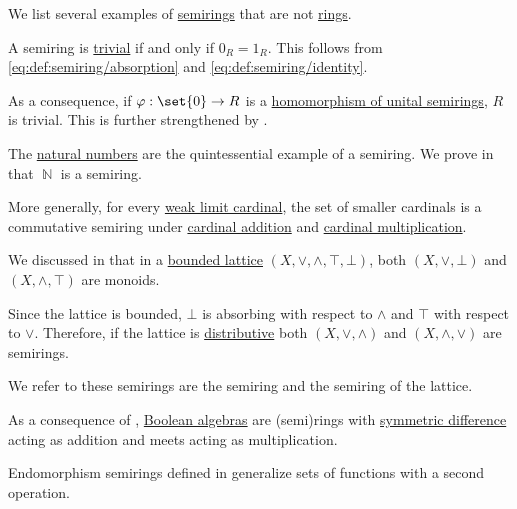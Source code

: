 \begin{example}\label{ex:def:semiring}
  We list several examples of \hyperref[def:semiring]{semirings} that are not \hyperref[def:ring]{rings}.

  \begin{thmenum}
     A semiring is \hyperref[def:semiring/trivial]{trivial} if and only if \( 0_R = 1_R \). This follows from \eqref{eq:def:semiring/absorption} and \eqref{eq:def:semiring/identity}.

    As a consequence, if \( \varphi: \set{ 0 } \to R \) is a \hyperref[def:semiring/homomorphism]{homomorphism of unital semirings}, \( R \) is trivial. This is further strengthened by .

     The \hyperref[def:natural_numbers]{natural numbers} are the quintessential example of a semiring. We prove in  that \( \BbbN \) is a semiring.

     More generally, for every \hyperref[def:successor_and_limit_cardinal/weak_limit]{weak limit cardinal}, the set of smaller cardinals is a commutative semiring under \hyperref[def:cardinal_arithmetic/addition]{cardinal addition} and \hyperref[def:cardinal_arithmetic/multiplication]{cardinal multiplication}.

     We discussed in  that in a \hyperref[def:extremal_points/bounds]{bounded lattice} \( (X, \vee, \wedge, \top, \bot) \), both \( (X, \vee, \bot) \) and \( (X, \wedge, \top) \) are monoids.

    Since the lattice is bounded, \( \bot \) is absorbing with respect to \( \wedge \) and \( \top \) with respect to \( \vee \). Therefore, if the lattice is \hyperref[def:distributive_lattice]{distributive} both \( (X, \vee, \wedge) \) and \( (X, \wedge, \vee) \) are semirings.

    We refer to these semirings are the  semiring and the  semiring of the lattice.

     As a consequence of , \hyperref[def:boolean_algebra]{Boolean algebras} are (semi)rings with \hyperref[def:symmetric_difference]{symmetric difference} acting as addition and meets acting as multiplication.

     Endomorphism semirings defined in  generalize sets of functions with a second operation.


\end{thmenum}
\end{example}
